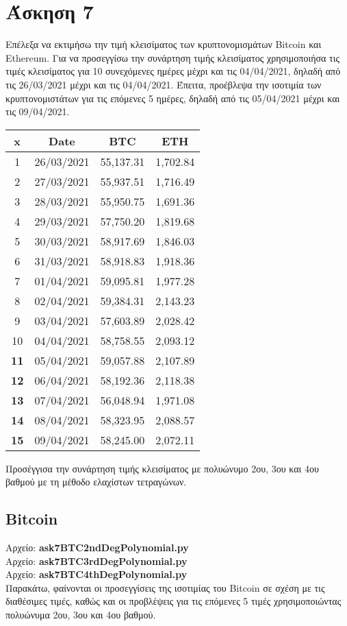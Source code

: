 \documentclass{article}
\newcommand{\lt}{\latintext}
\newcommand{\gt}{\greektext}
\begin{document}
\section{Άσκηση 7}
Επέλεξα να εκτιμήσω την τιμή κλεισίματος των κρυπτονομισμάτων \lt Bitcoin \gt και \lt Ethereum. \gt Για να προσεγγίσω την συνάρτηση τιμής κλεισίματος χρησιμοποιήσα τις τιμές κλεισίματος για 10 συνεχόμενες ημέρες μέχρι και τις 04/04/2021, δηλαδή από τις 26/03/2021 μέχρι και τις 04/04/2021. Έπειτα, προέβλεψα την ισοτιμία των κρυπτονομιστάτων για τις επόμενες 5 ημέρες, δηλαδή από τις 05/04/2021 μέχρι και τις 09/04/2021.
\lt
\begin{center}
\begin{tabular}{ |c|c|c|c| }
\hline
x & Date & BTC & ETH\\
\hline
1 & 26/03/2021 & 55,137.31 & 1,702.84\\
2 & 27/03/2021 & 55,937.51 & 1,716.49\\
3 & 28/03/2021 & 55,950.75 & 1,691.36\\
4 & 29/03/2021 & 57,750.20 & 1,819.68\\
5 & 30/03/2021 & 58,917.69 & 1,846.03\\
6 & 31/03/2021 & 58,918.83 & 1,918.36\\
7 & 01/04/2021 & 59,095.81 & 1,977.28\\
8 & 02/04/2021 & 59,384.31 & 2,143.23\\
9 & 03/04/2021 & 57,603.89 & 2,028.42\\
10 & 04/04/2021 & 58,758.55 & 2,093.12\\
\hline
\textbf{11} & 05/04/2021 & 59,057.88 & 2,107.89\\
\textbf{12} & 06/04/2021 & 58,192.36 & 2,118.38\\
\textbf{13} & 07/04/2021 & 56,048.94 & 1,971.08\\
\textbf{14} & 08/04/2021 & 58,323.95 & 2,088.57\\
\textbf{15} & 09/04/2021 & 58,245.00 & 2,072.11\\
\hline
\end{tabular}
\end{center}
\gt
Προσέγγισα την συνάρτηση τιμής κλεισίματος με πολυώνυμο 2ου, 3ου και 4ου βαθμού με τη μέθοδο ελαχίστων τετραγώνων.

\lt
\subsection{Bitcoin}
\gt
Αρχείο: \lt \textbf{ask7BTC2ndDegPolynomial.py} \gt \\
Αρχείο: \lt \textbf{ask7BTC3rdDegPolynomial.py} \gt \\
Αρχείο: \lt \textbf{ask7BTC4thDegPolynomial.py} \gt \\
Παρακάτω, φαίνονται οι προσεγγίσεις της ισοτιμίας του \lt Bitcoin \gt σε σχέση με τις διαθέσιμες τιμές, καθώς και οι προβλέψεις για τις επόμενες 5 τιμές χρησιμοποιώντας πολυώνυμα 2ου, 3ου και 4ου βαθμού.
\end{document}
